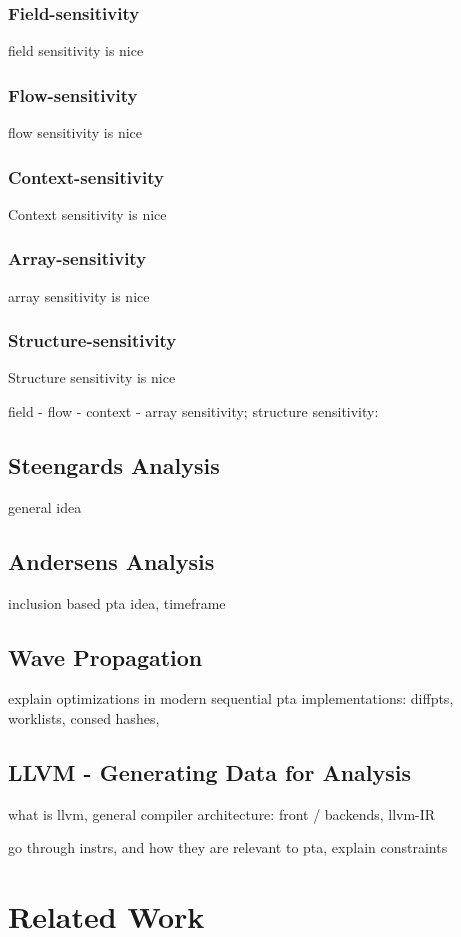 \subsubsection{Field-sensitivity}
field sensitivity is nice
\subsubsection{Flow-sensitivity}
flow sensitivity is nice
\subsubsection{Context-sensitivity}
Context sensitivity is nice
\subsubsection{Array-sensitivity}
array sensitivity is nice
\subsubsection{Structure-sensitivity}
Structure sensitivity is nice

field - flow - context - array sensitivity; structure sensitivity: \autocite{balatsouras2016structure}
\subsection{Steengards Analysis}
general idea
\subsection{Andersens Analysis}
inclusion based pta idea, timeframe
\subsection{Wave Propagation}
explain optimizations in modern sequential pta implementations: diffpts, worklists, consed hashes, \autocite{pereirawave}
\subsection{LLVM - Generating Data for Analysis}
what is llvm, general compiler architecture: front / backends, llvm-IR

go through instrs, and how they are relevant to pta, explain constraints \autocite{lin2015alias}
\section{Related Work}

